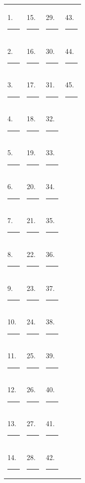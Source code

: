\documentclass[12pt]{article}
\begin{document}
\begin{tabular}{l l l l}
1.\ \rule{1.2cm}{0.15mm} \hspace{1cm} & 
15.\ \rule{1.2cm}{0.15mm} \hspace{1cm} & 
29.\ \rule{1.2cm}{0.15mm} \hspace{1cm} & 
43.\ \rule{1.2cm}{0.15mm} \\[6pt]

2.\ \rule{1.2cm}{0.15mm} & 
16.\ \rule{1.2cm}{0.15mm} & 
30.\ \rule{1.2cm}{0.15mm} & 
44.\ \rule{1.2cm}{0.15mm} \\[6pt]

3.\ \rule{1.2cm}{0.15mm} & 
17.\ \rule{1.2cm}{0.15mm} & 
31.\ \rule{1.2cm}{0.15mm} & 
45.\ \rule{1.2cm}{0.15mm} \\[6pt]

4.\ \rule{1.2cm}{0.15mm} & 
18.\ \rule{1.2cm}{0.15mm} & 
32.\ \rule{1.2cm}{0.15mm} & \\[6pt]

5.\ \rule{1.2cm}{0.15mm} & 
19.\ \rule{1.2cm}{0.15mm} & 
33.\ \rule{1.2cm}{0.15mm} & \\[6pt]

6.\ \rule{1.2cm}{0.15mm} & 
20.\ \rule{1.2cm}{0.15mm} & 
34.\ \rule{1.2cm}{0.15mm} & \\[6pt]

7.\ \rule{1.2cm}{0.15mm} & 
21.\ \rule{1.2cm}{0.15mm} & 
35.\ \rule{1.2cm}{0.15mm} & \\[6pt]

8.\ \rule{1.2cm}{0.15mm} & 
22.\ \rule{1.2cm}{0.15mm} & 
36.\ \rule{1.2cm}{0.15mm} & \\[6pt]

9.\ \rule{1.2cm}{0.15mm} & 
23.\ \rule{1.2cm}{0.15mm} & 
37.\ \rule{1.2cm}{0.15mm} & \\[6pt]

10.\ \rule{1.2cm}{0.15mm} & 
24.\ \rule{1.2cm}{0.15mm} & 
38.\ \rule{1.2cm}{0.15mm} & \\[6pt]

11.\ \rule{1.2cm}{0.15mm} & 
25.\ \rule{1.2cm}{0.15mm} & 
39.\ \rule{1.2cm}{0.15mm} & \\[6pt]

12.\ \rule{1.2cm}{0.15mm} & 
26.\ \rule{1.2cm}{0.15mm} & 
40.\ \rule{1.2cm}{0.15mm} & \\[6pt]

13.\ \rule{1.2cm}{0.15mm} & 
27.\ \rule{1.2cm}{0.15mm} & 
41.\ \rule{1.2cm}{0.15mm} & \\[6pt]

14.\ \rule{1.2cm}{0.15mm} & 
28.\ \rule{1.2cm}{0.15mm} & 
42.\ \rule{1.2cm}{0.15mm} & \\
\end{tabular}
\end{document}
